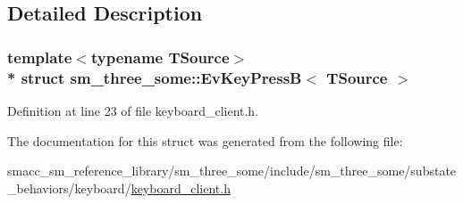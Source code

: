 \subsection{Detailed Description}
\subsubsection*{template$<$typename T\+Source$>$\\*
struct sm\+\_\+three\+\_\+some\+::\+Ev\+Key\+Press\+B$<$ T\+Source $>$}



Definition at line 23 of file keyboard\+\_\+client.\+h.



The documentation for this struct was generated from the following file\+:\begin{DoxyCompactItemize}
\item 
smacc\+\_\+sm\+\_\+reference\+\_\+library/sm\+\_\+three\+\_\+some/include/sm\+\_\+three\+\_\+some/substate\+\_\+behaviors/keyboard/\hyperlink{keyboard__client_8h}{keyboard\+\_\+client.\+h}\end{DoxyCompactItemize}
